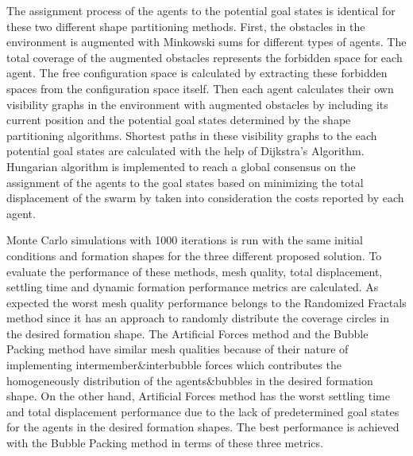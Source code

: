 The assignment process of the agents to the potential goal states is identical for these two different shape partitioning methods. First, the obstacles in the environment is augmented with Minkowski sums for different types of agents. The total coverage of the augmented obstacles represents the forbidden space for each agent. The free configuration space is calculated by extracting these forbidden spaces from the configuration space itself. Then each agent calculates their own visibility graphs in the environment with augmented obstacles by including its current position and the potential goal states determined by the shape partitioning algorithms. Shortest paths in these visibility graphs to the each potential goal states are calculated with the help of Dijkstra's Algorithm. Hungarian algorithm is implemented to reach a global consensus on the assignment of the agents to the goal states based on minimizing the total displacement of the swarm by taken into consideration the costs reported by each agent. 
       
Monte Carlo simulations with 1000 iterations is run with the same initial conditions and formation shapes for the three different proposed solution. To evaluate the performance of these methods, mesh quality, total displacement, settling time and dynamic formation performance metrics are calculated. As expected the worst mesh quality performance belongs to the Randomized Fractals method since it has an approach to randomly distribute the coverage circles in the desired formation shape. The Artificial Forces method and the Bubble Packing method have similar mesh qualities because of their nature of implementing intermember$\&$interbubble forces which contributes the homogeneously distribution of the agents$\&$bubbles in the desired formation shape. On the other hand, Artificial Forces method has the worst settling time and total displacement performance due to the lack of predetermined goal states for the agents in the desired formation shapes. The best performance is achieved with the Bubble Packing method in terms of these three metrics.
       
